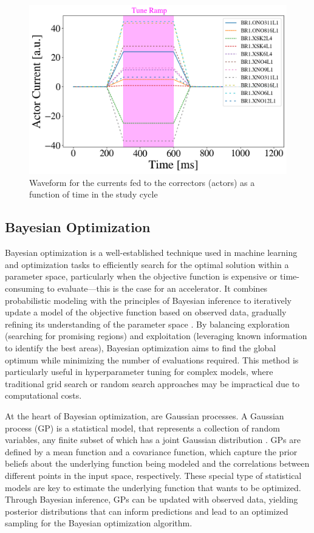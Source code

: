 \begin{figure}[H]
    \centering
    \includegraphics[width=\linewidth]{chapter5/actor_currents.png}
    \caption{Waveform for the currents fed to the correctors (actors) as a function of time in the study cycle}
    \label{fig:actorcurrents}
\end{figure}

\subsection{Bayesian Optimization}

Bayesian optimization is a well-established technique used in machine learning and optimization tasks to efficiently search for the optimal solution within a parameter space, particularly when the objective function is expensive or time-consuming to evaluate---this is the case for an accelerator. It combines probabilistic modeling with the principles of Bayesian inference to iteratively update a model of the objective function based on observed data, gradually refining its understanding of the parameter space \cite{bayesian}. By balancing exploration (searching for promising regions) and exploitation (leveraging known information to identify the best areas), Bayesian optimization aims to find the global optimum while minimizing the number of evaluations required. This method is particularly useful in hyperparameter tuning for complex models, where traditional grid search or random search approaches may be impractical due to computational costs.

At the heart of Bayesian optimization, are Gaussian processes. A Gaussian process (GP) is a statistical model, that represents a collection of random variables, any finite subset of which has a joint Gaussian distribution \cite{bayesian}. GPs are defined by a mean function and a covariance function, which capture the prior beliefs about the underlying function being modeled and the correlations between different points in the input space, respectively. These special type of statistical models are key to estimate the underlying function that wants to be optimized. Through Bayesian inference, GPs can be updated with observed data, yielding posterior distributions that can inform predictions and lead to an optimized sampling for the Bayesian optimization algorithm. 

